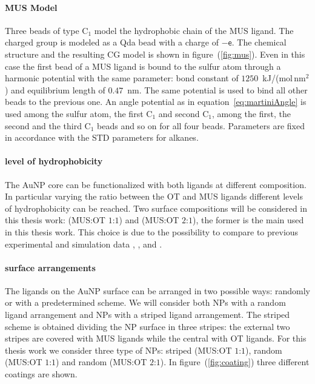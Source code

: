 \paragraph{\textbf{MUS Model}} Three \martini beads of type C$_1$ model the hydrophobic chain of the \ac{MUS} 
ligand. The charged group is modeled as a Qda bead with a charge of $-\mathsf{e}$. The chemical structure and the 
resulting \ac{CG} \martini model is shown in figure~(\ref{fig:mus}). Even in this case the first bead of a 
\ac{MUS} ligand is bound to the sulfur atom through a harmonic potential with the same parameter: bond constant 
of $1250$~kJ/(mol\,nm$^2$) and equilibrium length of $0.47$~nm. The same potential is used to bind all other 
beads to the previous one. An angle potential as in equation~\eqref{eq:martiniAngle} is used among the sulfur 
atom, the first C$_1$ and second C$_1$, among the first, the second and the third C$_1$ beads and so on for all 
four beads. Parameters are fixed in accordance with the \ac{STD} \martini parameters for alkanes.

\paragraph{\textbf{level of hydrophobicity}} The \ac{AuNP} core can be functionalized with both ligands at 
different composition. In particular varying the ratio between the \ac{OT} and \ac{MUS} ligands different levels 
of hydrophobicity can be reached. Two surface compositions will be considered in this thesis work: 
(\ac{MUS}:\ac{OT} $1$:$1$) and (\ac{MUS}:\ac{OT} $2$:$1$), the former is the main used in this thesis work. This 
choice is due to the possibility to compare to previous experimental and simulation data \cite{Maccarini2013}, 
\cite{VanLehn2013}, \cite{VanLehn2014} and \cite{VanLehn2015}.

\paragraph{\textbf{surface arrangements}} The ligands on the \ac{AuNP} surface can be arranged in two possible 
ways: randomly or with a predetermined scheme. We will consider both \acp{NP} with a random ligand arrangement 
and \acp{NP} with a striped ligand arrangement. The striped scheme is obtained dividing the \ac{NP} surface in 
three stripes: the external two stripes are covered with \ac{MUS} ligands while the central with \ac{OT} ligands. 
For this thesis work we consider three type of \acp{NP}: striped (\ac{MUS}:\ac{OT} $1$:$1$), random 
(\ac{MUS}:\ac{OT} $1$:$1$) and random (\ac{MUS}:\ac{OT} $2$:$1$). In figure~(\ref{fig:coating}) three different 
coatings are shown.

